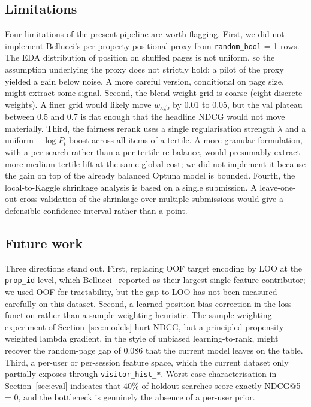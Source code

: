 \subsection{Limitations}

Four limitations of the present pipeline are worth flagging. First, we did not implement Bellucci's per-property positional proxy from \texttt{random\_bool} = 1 rows. The EDA distribution of position on shuffled pages is not uniform, so the assumption underlying the proxy does not strictly hold; a pilot of the proxy yielded a gain below noise. A more careful version, conditional on page size, might extract some signal. Second, the blend weight grid is coarse (eight discrete weights). A finer grid would likely move $w_{\text{xgb}}$ by 0.01 to 0.05, but the val plateau between 0.5 and 0.7 is flat enough that the headline NDCG would not move materially. Third, the fairness rerank uses a single regularisation strength $\lambda$ and a uniform $-\log P_t$ boost across all items of a tertile. A more granular formulation, with a per-search rather than a per-tertile re-balance, would presumably extract more medium-tertile lift at the same global cost; we did not implement it because the gain on top of the already balanced Optuna model is bounded. Fourth, the local-to-Kaggle shrinkage analysis is based on a single submission. A leave-one-out cross-validation of the shrinkage over multiple submissions would give a defensible confidence interval rather than a point.

\subsection{Future work}

Three directions stand out. First, replacing OOF target encoding by LOO at the \texttt{prop\_id} level, which Bellucci~\cite{bellucci2021dmt} reported as their largest single feature contributor; we used OOF for tractability, but the gap to LOO has not been measured carefully on this dataset. Second, a learned-position-bias correction in the loss function rather than a sample-weighting heuristic. The sample-weighting experiment of Section~\ref{sec:models} hurt NDCG, but a principled propensity-weighted lambda gradient, in the style of unbiased learning-to-rank, might recover the random-page gap of 0.086 that the current model leaves on the table. Third, a per-user or per-session feature space, which the current dataset only partially exposes through \texttt{visitor\_hist\_*}. Worst-case characterisation in Section~\ref{sec:eval} indicates that 40\% of holdout searches score exactly NDCG@5 = 0, and the bottleneck is genuinely the absence of a per-user prior.

